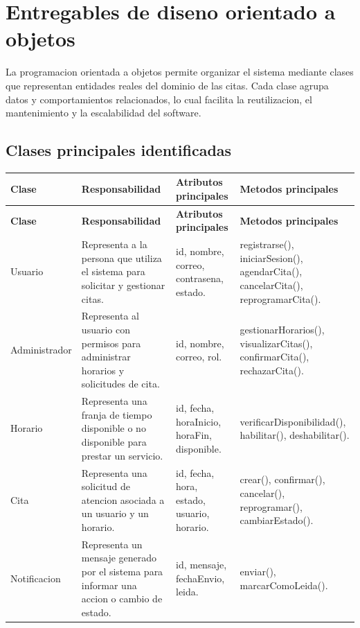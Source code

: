 \documentclass[12pt,letterpaper]{article}
\begin{document}
\section{Entregables de diseno orientado a objetos}

La programacion orientada a objetos permite organizar el sistema mediante clases que representan entidades reales del dominio de las citas. Cada clase agrupa datos y comportamientos relacionados, lo cual facilita la reutilizacion, el mantenimiento y la escalabilidad del software.

\subsection{Clases principales identificadas}

\begin{longtable}{|p{3cm}|p{4.5cm}|p{4.5cm}|p{4.2cm}|}
\hline
\textbf{Clase} & \textbf{Responsabilidad} & \textbf{Atributos principales} & \textbf{Metodos principales} \\
\hline
\endfirsthead
\hline
\textbf{Clase} & \textbf{Responsabilidad} & \textbf{Atributos principales} & \textbf{Metodos principales} \\
\hline
\endhead
\hline
\endfoot
\hline
\endlastfoot

Usuario & Representa a la persona que utiliza el sistema para solicitar y gestionar citas. & id, nombre, correo, contrasena, estado. & registrarse(), iniciarSesion(), agendarCita(), cancelarCita(), reprogramarCita(). \\
\hline

Administrador & Representa al usuario con permisos para administrar horarios y solicitudes de cita. & id, nombre, correo, rol. & gestionarHorarios(), visualizarCitas(), confirmarCita(), rechazarCita(). \\
\hline

Horario & Representa una franja de tiempo disponible o no disponible para prestar un servicio. & id, fecha, horaInicio, horaFin, disponible. & verificarDisponibilidad(), habilitar(), deshabilitar(). \\
\hline

Cita & Representa una solicitud de atencion asociada a un usuario y un horario. & id, fecha, hora, estado, usuario, horario. & crear(), confirmar(), cancelar(), reprogramar(), cambiarEstado(). \\
\hline

Notificacion & Representa un mensaje generado por el sistema para informar una accion o cambio de estado. & id, mensaje, fechaEnvio, leida. & enviar(), marcarComoLeida(). \\
\hline
\end{longtable}
\end{document}
